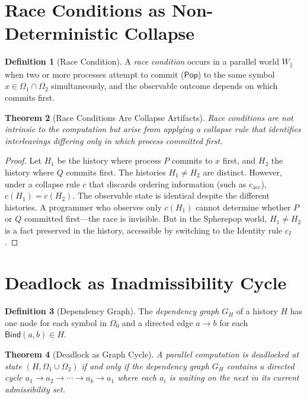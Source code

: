 \documentclass[12pt, a4paper, openany]{book}
\theoremstyle{plain}
\newtheorem{theorem}{Theorem}[chapter]
\theoremstyle{definition}
\newtheorem{definition}[theorem]{Definition}
\theoremstyle{remark}
\newcommand{\Pop}{\mathsf{Pop}}
\newcommand{\Bind}{\mathsf{Bind}}
\begin{document}
\section{Race Conditions as Non-Deterministic Collapse}

\begin{definition}[Race Condition]
A \emph{race condition} occurs in a parallel world $W_\parallel$ when two or
more processes attempt to commit ($\Pop$) to the same symbol $x \in \Omega_1
\cap \Omega_2$ simultaneously, and the observable outcome depends on which
commits first.
\end{definition}

\begin{theorem}[Race Conditions Are Collapse Artifacts]
Race conditions are not intrinsic to the computation but arise from applying
a collapse rule that identifies interleavings differing only in which process
committed first.
\end{theorem}

\begin{proof}
Let $H_1$ be the history where process $P$ commits to $x$ first, and $H_2$ the
history where $Q$ commits first. The histories $H_1 \neq H_2$ are distinct.
However, under a collapse rule $c$ that discards ordering information
(such as $c_{\mathrm{acc}}$), $c(H_1) = c(H_2)$. The observable state is
identical despite the different histories. A programmer who observes only
$c(H_1)$ cannot determine whether $P$ or $Q$ committed first---the race is
invisible. But in the Spherepop world, $H_1 \neq H_2$ is a fact preserved in
the history, accessible by switching to the Identity rule $c_I$.
\end{proof}

\section{Deadlock as Inadmissibility Cycle}

\begin{definition}[Dependency Graph]
The \emph{dependency graph} $G_H$ of a history $H$ has one node for each
symbol in $\Omega_0$ and a directed edge $a \to b$ for each $\Bind(a, b) \in H$.
\end{definition}

\begin{theorem}[Deadlock as Graph Cycle]
A parallel computation is deadlocked at state $(H, \Omega_1 \cup \Omega_2)$
if and only if the dependency graph $G_H$ contains a directed cycle $a_1 \to
a_2 \to \cdots \to a_k \to a_1$ where each $a_i$ is waiting on the next in
its current admissibility set.
\end{theorem}
\end{document}
